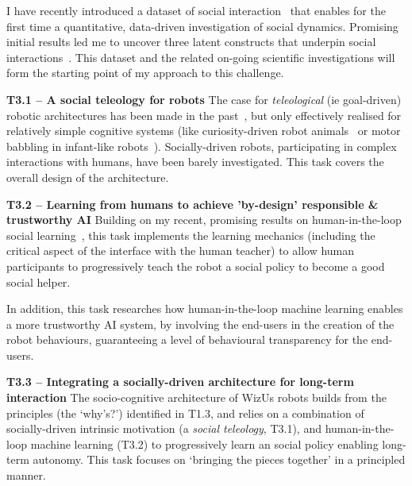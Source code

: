 \documentclass[11pt,a4paper]{report}
\newcommand{\project}{WizUs\xspace}
\begin{document}
I have recently introduced a dataset of social
interaction~\cite{lemaignan2018pinsoro} that enables for the first time a
quantitative, data-driven investigation of social dynamics. Promising initial
results led me to uncover three latent constructs that underpin social
interactions~\cite{bartlett2019what}. This dataset and the related on-going
scientific investigations will form the starting point of my approach to this
challenge.







\textbf{T3.1 -- A social teleology for robots}
The case for \emph{teleological} (ie goal-driven) robotic architectures has been
made in the past~\cite{wrede2012towards}, but only effectively realised for
relatively simple cognitive systems (like curiosity-driven robot
animals~\cite{oudeyer2005playground} or motor babbling in infant-like
robots~\cite{forestier2017unified}). Socially-driven robots, participating in
complex interactions with humans, have been barely investigated. This task
covers the overall design of the architecture.


\textbf{T3.2 -- Learning from humans to achieve 'by-design' responsible \&
trustworthy AI} Building on my recent, promising results on human-in-the-loop
social learning~\cite{senft2017supervised,senft2019teaching,winkle2020couch}, this task
implements the learning mechanics (including the critical aspect of the
interface with the human teacher) to allow human participants to progressively
teach the robot a social policy to become a good social helper.

In addition, this task researches how human-in-the-loop machine learning enables a more
trustworthy AI system, by involving the end-users in the creation of the robot
behaviours, guaranteeing a level of behavioural transparency for the end-users.

\textbf{T3.3 -- Integrating a socially-driven architecture for long-term interaction} The
socio-cognitive architecture of \project robots builds from the principles (the
`why's?') identified in T1.3, and relies on a combination of socially-driven
intrinsic motivation (a \emph{social teleology}, T3.1), and human-in-the-loop machine
learning (T3.2) to progressively learn an social policy enabling long-term
autonomy. This task focuses on `bringing the pieces together' in a principled
manner.
\end{document}

